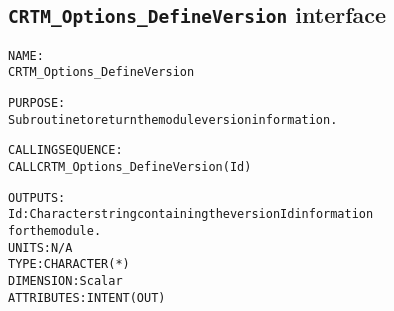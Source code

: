 \subsection{\texttt{CRTM\_Options\_DefineVersion} interface}
  \label{sec:CRTM_Options_DefineVersion_interface}
  \begin{alltt}
 
  NAME:
        CRTM_Options_DefineVersion
 
  PURPOSE:
        Subroutine to return the module version information.
 
  CALLING SEQUENCE:
        CALL CRTM_Options_DefineVersion( Id )
 
  OUTPUTS:
        Id:            Character string containing the version Id information
                       for the module.
                       UNITS:      N/A
                       TYPE:       CHARACTER(*)
                       DIMENSION:  Scalar
                       ATTRIBUTES: INTENT(OUT)
 
  \end{alltt}
